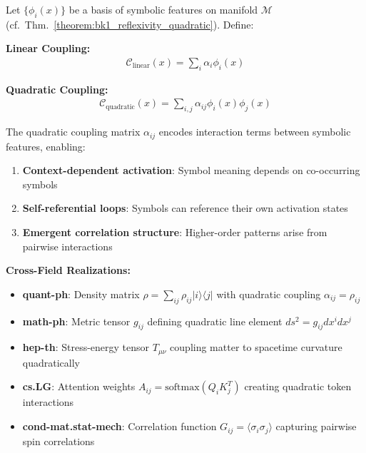 \begin{definition}
\label{definition:bk1_symbolic_coupling_basis}
Let $\{\phi_i(x)\}$ be a basis of symbolic features on manifold $\mathcal{M}$ (cf.~Thm.~\ref{theorem:bk1_reflexivity_quadratic}). Define:

\textbf{Linear Coupling:}
\begin{align}
\mathcal{C}_{\text{linear}}(x) = \sum_i \alpha_i \phi_i(x)
\end{align}

\textbf{Quadratic Coupling:}
\begin{align}
\mathcal{C}_{\text{quadratic}}(x) = \sum_{i,j} \alpha_{ij} \phi_i(x) \phi_j(x)
\end{align}

The quadratic coupling matrix $\alpha_{ij}$ encodes interaction terms between symbolic features, enabling:
\begin{enumerate}
\item \textbf{Context-dependent activation}: Symbol meaning depends on co-occurring symbols
\item \textbf{Self-referential loops}: Symbols can reference their own activation states  
\item \textbf{Emergent correlation structure}: Higher-order patterns arise from pairwise interactions
\end{enumerate}

\textbf{Cross-Field Realizations:}
\begin{itemize}
\item \textbf{quant-ph}: Density matrix $\rho = \sum_{ij} \rho_{ij} |i\rangle \langle j|$ with quadratic coupling $\alpha_{ij} = \rho_{ij}$
\item \textbf{math-ph}: Metric tensor $g_{ij}$ defining quadratic line element $ds^2 = g_{ij} dx^i dx^j$
\item \textbf{hep-th}: Stress-energy tensor $T_{\mu\nu}$ coupling matter to spacetime curvature quadratically
\item \textbf{cs.LG}: Attention weights $A_{ij} = \text{softmax}(Q_i K_j^T)$ creating quadratic token interactions
\item \textbf{cond-mat.stat-mech}: Correlation function $G_{ij} = \langle \sigma_i \sigma_j \rangle$ capturing pairwise spin correlations
\end{itemize}
\end{definition}

